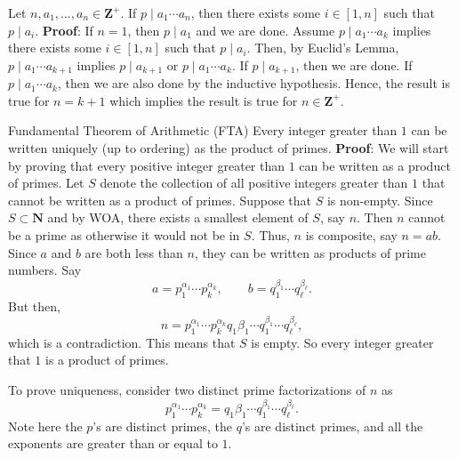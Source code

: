 \begin{Proposition}{}{}
    Let $ n,a_1,\ldots,a_n\in\mathbf{Z}^+ $.
    If $ p\mid a_1\cdots a_n $, then there exists some $ i\in[1,n] $ such that
    $ p\mid a_i $.
    \tcblower{}
    \textbf{Proof}: If $ n=1 $, then $ p\mid a_1 $ and we are done.
    Assume $ p\mid a_1\cdots a_k $ implies there exists some $ i\in[1,n] $
    such that $ p\mid a_i $. Then, by Euclid's Lemma, $ p\mid a_1\cdots a_{k+1} $
    implies $ p\mid a_{k+1} $ or $ p\mid a_1\cdots a_k $. If $ p\mid a_{k+1} $, then we are done.
    If $ p\mid a_1\cdots a_k $, then we are also done by the inductive hypothesis.
    Hence, the result is true for $ n=k+1 $ which implies the result is true for $ n\in\mathbf{Z}^+ $.
\end{Proposition}
\begin{Theorem}{Fundamental Theorem of Arithmetic (FTA)}{}
    Every integer greater than $1$ can be written uniquely (up to ordering) as the
    product of primes.
    \tcblower{}
    \textbf{Proof}: We will start by proving that every positive integer greater than $1$
    can be written as a product of primes. Let $S$ denote the collection of all positive
    integers greater than $1$ that cannot be written as a product of primes. Suppose
    that $S$ is non-empty. Since $ S\subset \mathbf{N} $ and by WOA, there exists a smallest element of
    $S$, say $n$. Then $n$ cannot be a prime as otherwise it would not be in $S$. Thus, $n$ is
    composite, say $n = ab$. Since $a$ and $b$ are both less than $n$, they can be written as
    products of prime numbers. Say
    \[ a=p_1^{\alpha_1}\cdots p_k^{\alpha_k},\qquad b=q_1^{\beta_1}\cdots q_{\ell}^{\beta_{\ell}}. \]
    But then,
    \[ n=p_1^{\alpha_1}\cdots p_k^{\alpha_k}q_1{\beta_1}\cdots q_1^{\beta_1}\cdots q_{\ell}^{\beta_{\ell}}, \]
    which is a contradiction. This means that $S$ is empty. So every integer greater that
    $1$ is a product of primes.

    To prove uniqueness, consider two distinct prime factorizations of $n$ as
    \[ p_1^{\alpha_1}\cdots p_k^{\alpha_k}=q_1{\beta_1}\cdots q_1^{\beta_1}\cdots q_{\ell}^{\beta_{\ell}}. \]
    Note here the $p$'s are distinct primes, the $q$'s are distinct primes, and all the exponents are greater than or equal to $1$.


\end{Theorem}
